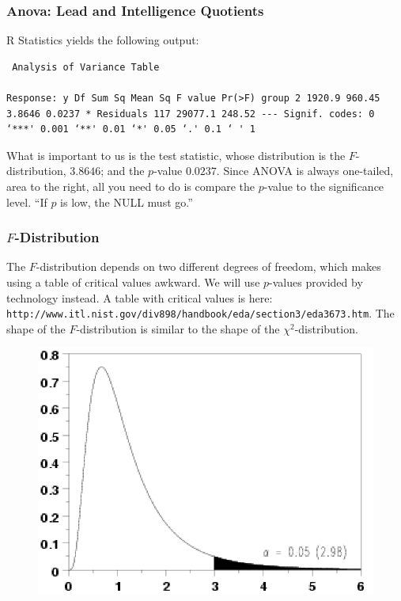 \documentclass[xcolor=dvipsnames]{beamer} \usepackage{teachbeamer}
\begin{document}
\begin{frame}[fragile]
  \frametitle{Anova: Lead and Intelligence Quotients} R Statistics yields the following output:
\begin{verbatim} Analysis of Variance Table

Response: y Df Sum Sq Mean Sq F value Pr(>F) group 2 1920.9 960.45 3.8646 0.0237 * Residuals 117 29077.1 248.52 --- Signif. codes: 0 ‘***' 0.001 ‘**' 0.01 ‘*' 0.05 ‘.' 0.1 ‘ ' 1
\end{verbatim} What is important to us is the test statistic, whose distribution is the $F$-distribution, $3.8646$; and the $p$-value $0.0237$. Since ANOVA is always one-tailed, area to the right, all you need to do is compare the $p$-value to the significance level. ``If $p$ is low, the NULL must go.''
\end{frame}

\begin{frame}
  \frametitle{$F$-Distribution} The $F$-distribution depends on two different degrees of freedom, which makes using a table of critical values awkward. We will use $p$-values provided by technology instead. A table with critical values is here: {\footnotesize \texttt{http://www.itl.nist.gov/div898/handbook/eda/section3/eda3673.htm}}. The shape of the $F$-distribution is similar to the shape of the $\chi^{2}$-distribution.
\begin{figure}[h]
  \includegraphics[scale=0.25]{./diagrams/fdist.png}
\end{figure}
\end{frame}
\end{document}
